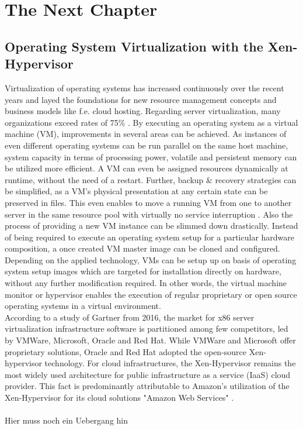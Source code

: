 \chapter{The Next Chapter}
\label{cha:2}

\section{Operating System Virtualization with the Xen-Hypervisor}

Virtualization of operating systems has increased continuously over the recent years and layed the foundations for new resource management concepts and business models like f.e. cloud hosting. Regarding server virtualization, many organizations exceed rates of 75\% \cite{gartnervmmarket}. By executing an operating system as a virtual machine (VM), improvements in several areas can be achieved. As instances of even different operating systems can be run parallel on the same host machine, system capacity in terms of processing power, volatile and persistent memory can be utilized more efficient. A VM can even be assigned resources dynamically at runtime, without the need of a restart. Further, backup \& recovery strategies can be simplified, as a VM's physical presentation at any certain state can be preserved in files. This even enables to move a running VM from one to another server in the same resource pool with virtually no service interruption \cite{migratevms}. Also the process of providing a new VM instance can be slimmed down drastically. Instead of being required to execute an operating system setup for a particular hardware composition, a once created VM master image can be cloned and configured. Depending on the applied technology, VMs can be setup up on basis of operating system setup images which are targeted for installation directly on hardware, without any further modification required. In other words, the virtual machine monitor or hypervisor enables the execution of regular proprietary or open source operating systems in a virtual environment. \\
According to a study of Gartner from 2016, the market for x86 server virtualization infrastructure software is partitioned among few competitors, led by VMWare, Microsoft, Oracle and Red Hat. While VMWare and Microsoft offer proprietary solutions, Oracle and Red Hat adopted the open-source Xen-hypervisor technology. For cloud infrastructures, the Xen-Hypervisor remains the most widely used architecture for public infrastructure as a service (IaaS) cloud provider. This fact is predominantly attributable to Amazon's utilization of the Xen-Hypervisor for its cloud solutions "Amazon Web Services" \cite{bittman2016magic}.
\\~\\
Hier muss noch ein Uebergang hin
\\


